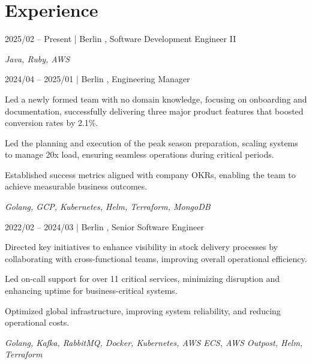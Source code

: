 \section{Experience}

    \begin{twocolentry}{2025/02 -- Present | Berlin}
        ,
        Software Development Engineer II
    \end{twocolentry}
    \begin{onecolentry}
        \textit{Java, Ruby, AWS}
    \end{onecolentry}
    \vspace{0.3cm}

    \begin{twocolentry}{2024/04 -- 2025/01 | Berlin}
        ,
        Engineering Manager
    \end{twocolentry}
    \begin{onecolentry}
        \begin{highlights}
            \item Led a newly formed team with no domain knowledge, focusing on onboarding and documentation, successfully delivering three major product features that boosted conversion rates by 2.1\%.
            \item Led the planning and execution of the peak season preparation, scaling systems to manage 20x load, ensuring seamless operations during critical periods.
            \item Established success metrics aligned with company OKRs, enabling the team to achieve measurable business outcomes.
        \end{highlights}
        \textit{Golang, GCP, Kubernetes, Helm, Terraform, MongoDB}
    \end{onecolentry}
    \vspace{0.3cm}


    \begin{twocolentry}{2022/02 -- 2024/03 | Berlin}
        ,
        Senior Software Engineer
    \end{twocolentry}
    \begin{onecolentry}
        \begin{highlights}
            \item Directed key initiatives to enhance visibility in stock delivery processes by collaborating with cross-functional teams, improving overall operational efficiency.
            \item Led on-call support for over 11 critical services, minimizing disruption and enhancing uptime for business-critical systems.
            \item Optimized global infrastructure, improving system reliability, and reducing operational costs.
        \end{highlights}
        \textit{Golang, Kafka, RabbitMQ, Docker, Kubernetes, AWS ECS, AWS Outpost, Helm, Terraform}
    \end{onecolentry}
    \vspace{0.3cm}


